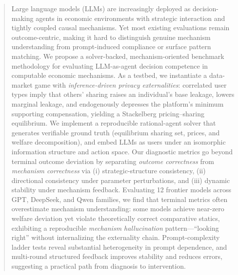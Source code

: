 \documentclass[sigconf,anonymous,review]{acmart}
\theoremstyle{definition}
\begin{document}
\begin{abstract}
Large language models (LLMs) are increasingly deployed as decision-making agents in economic environments with strategic interaction and tightly coupled causal mechanisms. Yet most existing evaluations remain outcome-centric, making it hard to distinguish genuine mechanism understanding from prompt-induced compliance or surface pattern matching. We propose a solver-backed, mechanism-oriented benchmark methodology for evaluating LLM-as-agent decision competence in computable economic mechanisms. As a testbed, we instantiate a data-market game with \emph{inference-driven privacy externalities}: correlated user types imply that others' sharing raises an individual’s base leakage, lowers marginal leakage, and endogenously depresses the platform’s minimum supporting compensation, yielding a Stackelberg pricing--sharing equilibrium. We implement a reproducible rational-agent solver that generates verifiable ground truth (equilibrium sharing set, prices, and welfare decomposition), and embed LLMs as users under an isomorphic information structure and action space. Our diagnostic metrics go beyond terminal outcome deviation by separating \emph{outcome correctness} from \emph{mechanism correctness} via (i) strategic-structure consistency, (ii) directional consistency under parameter perturbations, and (iii) dynamic stability under mechanism feedback.
Evaluating 12 frontier models across GPT, DeepSeek, and Qwen families, we find that terminal metrics often overestimate mechanism understanding: some models achieve near-zero welfare deviation yet violate theoretically correct comparative statics, exhibiting a reproducible \emph{mechanism hallucination} pattern—``looking right'' without internalizing the externality chain. Prompt-complexity ladder tests reveal substantial heterogeneity in prompt dependence, and multi-round structured feedback improves stability and reduces errors, suggesting a practical path from diagnosis to intervention.
\end{abstract}

\end{document}

